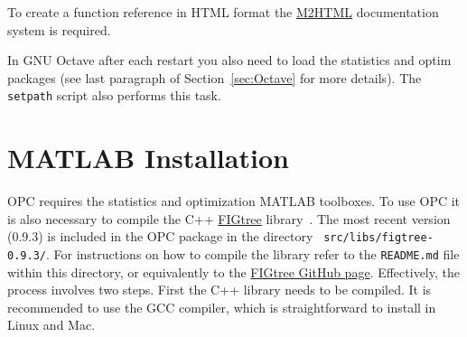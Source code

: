 \documentclass{book}
\begin{document}
\noindent
%
To create a function reference in HTML format the
%
\href{https://www.artefact.tk/software/matlab/m2html/}{M2HTML}
%
documentation system is required.



%
%

%

\noindent
%
In GNU Octave after each restart you also need to load the statistics and optim
packages (see last paragraph of Section~\ref{sec:Octave} for more details). 
The {\tt setpath} script also performs this task.

%


\section{MATLAB Installation}

OPC requires the statistics and optimization MATLAB toolboxes. 
To use OPC it is also necessary
to compile the C++
\href{https://github.com/vmorariu/figtree}{FIGtree}
library~\cite{Morariu08}.
%
The most recent version (0.9.3) is included in the OPC package in the directory {\tt
src/libs/figtree-0.9.3/}. For instructions on how to compile the library
refer to the {\tt README.md} file within this directory, or equivalently
to the \href{https://github.com/vmorariu/figtree}{FIGtree GitHub page}.
Effectively, the process involves two steps. First the C++ library needs to be compiled.
It is recommended to use the GCC compiler, which is straightforward to install
in Linux and Mac.
\end{document}
